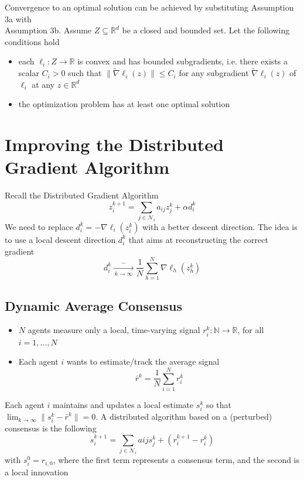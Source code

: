 \documentclass{book}
\newcommand{\R}{\mathbb{R}}
\newcommand{\N}{\mathbb{N}}
\theoremstyle{theoremv2}
\theoremstyle{defv2}
\theoremstyle{remark}
\theoremstyle{remark}
\theoremstyle{definition}
\theoremstyle{definition}
\begin{document}
Convergence to an optimal solution can be achieved by substituting Assumption 3a with 
\\Assumption 3b. Assume $Z\subseteq \R^d$ be a closed and bounded set. Let the following conditions hold 
\begin{itemize}
    \item each $\ell_i:Z\to\R$ is convex and has bounded subgradients, i.e. there exists a scalar $C_i>0$ such that $\|\tilde\nabla\ell_i(z)\|\leq C_i$ for any subgradient $\tilde\nabla\ell_i(z)$ of $\ell_i$ at any $z\in\R^d$
        \item the optimization problem has at least one optimal solution
\end{itemize}

\section{Improving the Distributed Gradient Algorithm}
Recall the Distributed Gradient Algorithm 
\[
    z_i^{k+1} = \displaystyle\sum_{j\in\mathcal{N}_i}a_{ij}z_j^k + \alpha d_i^k
\]
We need to replace $d_i^k = -\nabla \ell_i(z_i^k)$ with a better descent direction. The idea is to use a local descent direction $d_i^k$ that aims at reconstructing the correct gradient
\[
    d_i^k \xrightarrow[\ k\to\infty\ ]-\displaystyle\frac{1}{N} \displaystyle\sum_{h=1}^{N}\nabla\ell_h(z_h^k)
\]

\subsection{Dynamic Average Consensus}
\begin{itemize}
    \item $N$ agents measure only a local, time-varying signal $r_i^k:\N\to\R$, for all $i=1,\dots,N$
    \item Each agent $i$ wants to estimate/track the average signal
        \[
            \bar{r}^k = \displaystyle\frac{1}{N} \displaystyle\sum_{i=1}^{N}r_i^k
        \]
\end{itemize}
Each agent $i$ maintains and updates a local estimate $s_i^k$ so that $\lim_{k\to\infty}\|s_i^k-\bar{r}^k\|=0$. A distributed algorithm based on a (perturbed) consensus is the following 
\[
    s_i^{k+1} = \displaystyle\sum_{j\in\mathcal{N}_i} a{ij} s_j^k + \left(r_i^{k+1}-r_i^k\right)
\]
with $s_i^0 = r_{i,0}$, where the first term represents a consensus term, and the second is a local innovation
\end{document}
